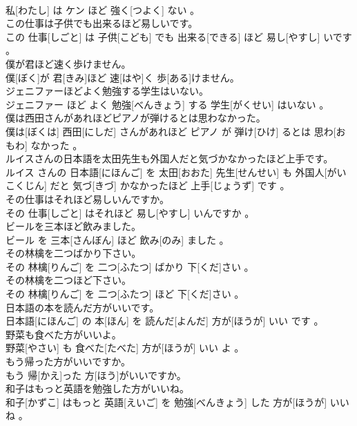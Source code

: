 \documentclass[8pt]{extreport}
\begin{document}
\begin{CJK}{UTF8}{min}
\\	私[わたし] は ケン ほど 強く[つよく] ない 。
\\	この仕事は子供でも出来るほど易しいです。	
\\	この 仕事[しごと] は 子供[こども] でも 出来る[できる] ほど 易し[やすし] いです 。
\\	僕が君ほど速く歩けません。	
\\	僕[ぼく]が 君[きみ]ほど 速[はや]く 歩[ある]けません。
\\	ジェニファーほどよく勉強する学生はいない。	
\\	ジェニファー ほど よく 勉強[べんきょう] する 学生[がくせい] はいない 。
\\	僕は西田さんがあれほどピアノが弾けるとは思わなかった。	
\\	僕は[ぼくは] 西田[にしだ] さんがあれほど ピアノ が 弾け[ひけ] るとは 思わ[おもわ] なかった 。
\\	ルイスさんの日本語を太田先生も外国人だと気づかなかったほど上手です。	
\\	ルイス さんの 日本語[にほんご] を 太田[おおた] 先生[せんせい] も 外国人[がいこくじん] だと 気づ[きづ] かなかったほど 上手[じょうず] です 。
\\	その仕事はそれほど易しいんですか。	
\\	その 仕事[しごと] はそれほど 易し[やすし] いんですか 。
\\	ビールを三本ほど飲みました。	
\\	ビール を 三本[さんぼん] ほど 飲み[のみ] ました 。
\\	その林檎を二つばかり下さい。	
\\	その 林檎[りんご] を 二つ[ふたつ] ばかり 下[くだ]さい 。
\\	その林檎を二つほど下さい。	
\\	その 林檎[りんご] を 二つ[ふたつ] ほど 下[くだ]さい 。
\\	日本語の本を読んだ方がいいです。	
\\	日本語[にほんご] の 本[ほん] を 読んだ[よんだ] 方が[ほうが] いい です 。
\\	野菜も食べた方がいいよ。	
\\	野菜[やさい] も 食べた[たべた] 方が[ほうが] いい よ 。
\\	もう帰った方がいいですか。	
\\	もう 帰[かえ]った 方[ほう]がいいですか。
\\	和子はもっと英語を勉強した方がいいね。	
\\	和子[かずこ] はもっと 英語[えいご] を 勉強[べんきょう] した 方が[ほうが] いい ね 。

\end{CJK}
\end{document}
